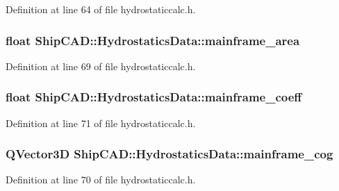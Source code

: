 Definition at line 64 of file hydrostaticcalc.\-h.

\hypertarget{structShipCAD_1_1HydrostaticsData_ab2b49d5dea89ae998116c8ff4cac2b53}{
\subsubsection[{mainframe\-\_\-area}]{\setlength{\rightskip}{0pt plus 5cm}float Ship\-C\-A\-D\-::\-Hydrostatics\-Data\-::mainframe\-\_\-area}}\label{structShipCAD_1_1HydrostaticsData_ab2b49d5dea89ae998116c8ff4cac2b53}


Definition at line 69 of file hydrostaticcalc.\-h.

\hypertarget{structShipCAD_1_1HydrostaticsData_a4208b97fe6110516d71e67708186897a}{
\subsubsection[{mainframe\-\_\-coeff}]{\setlength{\rightskip}{0pt plus 5cm}float Ship\-C\-A\-D\-::\-Hydrostatics\-Data\-::mainframe\-\_\-coeff}}\label{structShipCAD_1_1HydrostaticsData_a4208b97fe6110516d71e67708186897a}


Definition at line 71 of file hydrostaticcalc.\-h.

\hypertarget{structShipCAD_1_1HydrostaticsData_ab726ebe5c185d197a25e4477576266a4}{
\subsubsection[{mainframe\-\_\-cog}]{\setlength{\rightskip}{0pt plus 5cm}Q\-Vector3\-D Ship\-C\-A\-D\-::\-Hydrostatics\-Data\-::mainframe\-\_\-cog}}\label{structShipCAD_1_1HydrostaticsData_ab726ebe5c185d197a25e4477576266a4}


Definition at line 70 of file hydrostaticcalc.\-h.

